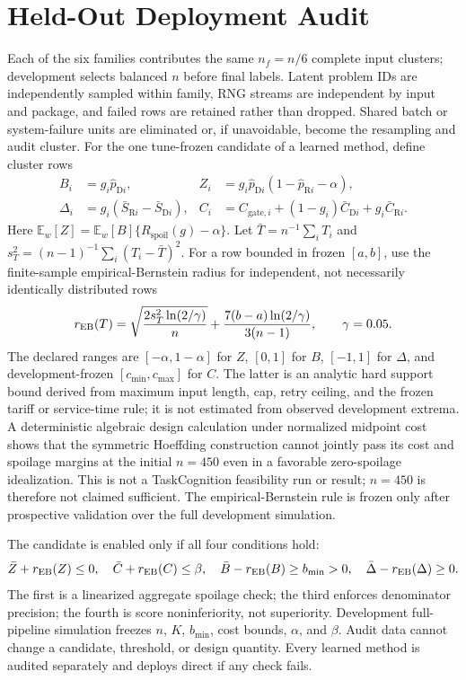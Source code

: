 \documentclass{article}
\newcommand{\D}{\ensuremath{\mathrm{D}}}
\newcommand{\Rpol}{\ensuremath{\mathrm{R}}}
\newcommand{\1}{\mathbb{I}}
\newcommand{\Ew}{\mathbb{E}_{w}}
\newcommand{\Rspoil}{R_{\mathrm{spoil}}}
\begin{document}
\section{Held-Out Deployment Audit}
Each of the six families contributes the same $n_f=n/6$ complete input clusters; development selects balanced $n$ before final labels. Latent problem IDs are independently sampled within family, RNG streams are independent by input and package, and failed rows are retained rather than dropped. Shared batch or system-failure units are eliminated or, if unavoidable, become the resampling and audit cluster. For the one tune-frozen candidate of a learned method, define cluster rows
\begin{align}
 B_i&=g_i\widehat p_{\D i}, &
 Z_i&=g_i\widehat p_{\D i}(1-\widehat p_{\Rpol i}-\alpha),\\
 \Delta_i&=g_i(\bar S_{\Rpol i}-\bar S_{\D i}), &
 C_i&=C_{\mathrm{gate},i}+(1-g_i)\bar C_{\D i}+g_i\bar C_{\Rpol i}.
 \label{eq:audit-rows}
\end{align}
Here $\Ew[Z]=\Ew[B]\{\Rspoil(g)-\alpha\}$. Let $\bar T=n^{-1}\sum_iT_i$ and $s_T^2=(n-1)^{-1}\sum_i(T_i-\bar T)^2$. For a row bounded in frozen $[a,b]$, use the finite-sample empirical-Bernstein radius for independent, not necessarily identically distributed rows \citep{maurer2009empirical}
\begin{equation}
 r_{\rm EB}(T)=\sqrt{\frac{2s_T^2\ln(2/\gamma)}{n}}
 +\frac{7(b-a)\ln(2/\gamma)}{3(n-1)},\qquad \gamma=0.05.
 \label{eq:eb}
\end{equation}
The declared ranges are $[-\alpha,1-\alpha]$ for $Z$, $[0,1]$ for $B$, $[-1,1]$ for $\Delta$, and development-frozen $[c_{\min},c_{\max}]$ for $C$. The latter is an analytic hard support bound derived from maximum input length, cap, retry ceiling, and the frozen tariff or service-time rule; it is not estimated from observed development extrema. A deterministic algebraic design calculation under normalized midpoint cost shows that the symmetric Hoeffding construction \citep{hoeffding1963probability} cannot jointly pass its cost and spoilage margins at the initial $n=450$ even in a favorable zero-spoilage idealization. This is not a TaskCognition feasibility run or result; $n=450$ is therefore not claimed sufficient. The empirical-Bernstein rule is frozen only after prospective validation over the full development simulation.

The candidate is enabled only if all four conditions hold:
\begin{equation}
 \bar Z+r_{\rm EB}(Z)\leq0,\quad
 \bar C+r_{\rm EB}(C)\leq\beta,\quad
 \bar B-r_{\rm EB}(B)\geq b_{\min}>0,\quad
 \bar\Delta-r_{\rm EB}(\Delta)\geq0.
 \label{eq:audit-pass}
\end{equation}
The first is a linearized aggregate spoilage check; the third enforces denominator precision; the fourth is score noninferiority, not superiority. Development full-pipeline simulation freezes $n$, $K$, $b_{\min}$, cost bounds, $\alpha$, and $\beta$. Audit data cannot change a candidate, threshold, or design quantity. Every learned method is audited separately and deploys direct if any check fails.
\end{document}

